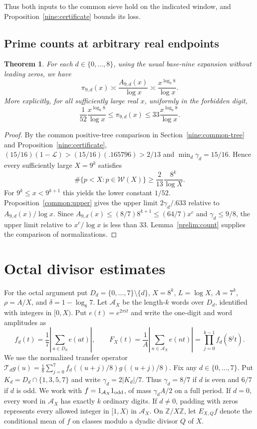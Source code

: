 \documentclass[11pt,a4paper]{article}
\theoremstyle{paperplain}
\newtheorem{theorem}{Theorem}[section]
\numberwithin{equation}{section}
\begin{document}
Thus both inputs to the common sieve hold on the indicated window,
and Proposition~\ref{nine:certificate} bounds its loss.

\subsection{Prime counts at arbitrary real endpoints}

\begin{theorem}\label{nine:theorem}
For each $d\in\{0,\ldots,8\}$, using the usual base-nine expansion without
leading zeros, we have
\[
 \pi_{9,d}(x)\asymp\frac{A_{9,d}(x)}{\log x}
 \asymp\frac{x^{\log_9 8}}{\log x}.
\]
More explicitly, for all sufficiently large real $x$, uniformly in the
forbidden digit,
\begin{equation}\label{nine:explicit}
 \frac1{52}\frac{x^{\log_9 8}}{\log x}
 \le\pi_{9,d}(x)\le33\frac{x^{\log_9 8}}{\log x}.
\end{equation}
\end{theorem}

\begin{proof}
By the common positive-tree comparison in Section~\ref{nine:common-tree}
and Proposition~\ref{nine:certificate}, $(15/16)(1-\mathscr L)>(15/16)(.165796)>2/13$
and $\min_d\gamma_d=15/16$.
Hence every sufficiently large $X=9^k$ satisfies
\[
 \#\{p<X:p\in\mathcal W(X)\}\ge\frac2{13}\frac{8^k}{\log X}.
\]
For $9^k\le x<9^{k+1}$ this yields the lower constant $1/52$.
Proposition~\ref{common:upper} gives the upper limit $2\gamma_d/.633$
relative to $A_{9,d}(x)/\log x$. Since
$A_{9,d}(x)\le(8/7)8^{k+1}\le (64/7)x^c$ and $\gamma_d\le9/8$,
the upper limit relative to $x^c/\log x$ is less than $33$.
Lemma~\ref{prelim:count} supplies the comparison of normalizations.
\end{proof}

\clearpage

\section{Octal divisor estimates}
\label{sec:octal-typeI}

For the octal argument put $D_d=\{0,\ldots,7\}\setminus\{d\}$,
$X=8^k$, $L=\log X$, $A=7^k$, $\rho=A/X$, and
$\delta=1-\log_8 7$. Let $\mathcal A_X$ be the length-$k$ words
over $D_d$, identified with integers in $[0,X)$. Put $e(t)=e^{2\pi i t}$
and write the one-digit and word amplitudes as
\[
 f_d(t)=\frac17\left|\sum_{a\in D_d}e(at)\right|,
 \qquad
 F_X(t)=\frac1A\left|\sum_{n\in\mathcal A_X}e(nt)\right|
       =\prod_{j=0}^{k-1}f_d(8^jt).
\]
We use the normalized transfer operator
$\mathcal T_d g(u)=\tfrac18\sum_{j=0}^7 f_d((u+j)/8)g((u+j)/8)$.
Fix any $d\in\{0,\ldots,7\}$. Put $K_d=D_d\cap\{1,3,5,7\}$ and
write $\gamma_d=2|K_d|/7$. Thus $\gamma_d=8/7$ if $d$ is even and
$6/7$ if $d$ is odd. We work with $f=1_{\mathcal A_X}1_{\rm odd}$,
of mass $\gamma_d A/2$ on a full period. If $d=0$, every word in
$\mathcal A_X$ has exactly $k$ ordinary digits. If $d\ne0$, padding
with zeros represents every allowed integer in $[1,X)$ in $\mathcal A_X$.
On $\mathbb Z/X\mathbb Z$, let $E_{X,Q}f$ denote the conditional mean
of $f$ on classes modulo a dyadic divisor $Q$ of $X$.
\end{document}
